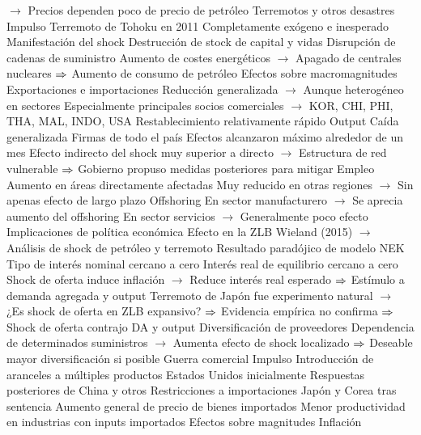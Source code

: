 \documentclass{nuevotema}
\begin{document}
\begin{esquemal}
				\4[] $\to$ Precios dependen poco de precio de petróleo
		\2 Terremotos y otros desastres
			\3 Impulso
				\4 Terremoto de Tohoku en 2011
				\4 Completamente exógeno e inesperado
			\3 Manifestación del shock
				\4 Destrucción de stock de capital y vidas
				\4 Disrupción de cadenas de suministro
				\4 Aumento de costes energéticos
				\4[] $\to$ Apagado de centrales nucleares
				\4[] $\Rightarrow$ Aumento de consumo de petróleo
			\3 Efectos sobre macromagnitudes
				\4 Exportaciones e importaciones
				\4[] Reducción generalizada
				\4[] $\to$ Aunque heterogéneo en sectores
				\4[] Especialmente principales socios comerciales
				\4[] $\to$ KOR, CHI, PHI, THA, MAL, INDO, USA
				\4[] Restablecimiento relativamente rápido
				\4 Output
				\4[] Caída generalizada
				\4[] Firmas de todo el país
				\4[] Efectos alcanzaron máximo alrededor de un mes
				\4[] Efecto indirecto del shock muy superior a directo
				\4[] $\to$ Estructura de red vulnerable
				\4[] $\Rightarrow$ Gobierno propuso medidas posteriores para mitigar
				\4 Empleo
				\4[] Aumento en áreas directamente afectadas
				\4[] Muy reducido en otras regiones
				\4[] $\to$ Sin apenas efecto de largo plazo
				\4 Offshoring
				\4[] En sector manufacturero
				\4[] $\to$ Se aprecia aumento del offshoring
				\4[] En sector servicios
				\4[] $\to$ Generalmente poco efecto
			\3 Implicaciones de política económica
				\4 Efecto en la ZLB
				\4[] Wieland (2015)
				\4[] $\to$ Análisis de shock de petróleo y terremoto
				\4[] Resultado paradójico de modelo NEK
				\4[] Tipo de interés nominal cercano a cero
				\4[] Interés real de equilibrio cercano a cero
				\4[] Shock de oferta induce inflación
				\4[] $\to$ Reduce interés real esperado
				\4[] $\Rightarrow$ Estímulo a demanda agregada y output
				\4[] Terremoto de Japón fue experimento natural
				\4[] $\to$ ¿Es shock de oferta en ZLB expansivo?
				\4[] $\Rightarrow$ Evidencia empírica no confirma
				\4[] $\Rightarrow$ Shock de oferta contrajo DA y output
				\4 Diversificación de proveedores
				\4[] Dependencia de determinados suministros
				\4[] $\to$ Aumenta efecto de shock localizado
				\4[] $\Rightarrow$ Deseable mayor diversificación si posible
		\2 Guerra comercial
			\3 Impulso
				\4 Introducción de aranceles a múltiples productos
				\4[] Estados Unidos inicialmente
				\4[] Respuestas posteriores de China y otros
				\4 Restricciones a importaciones
				\4[] Japón y Corea tras sentencia
				\4 Aumento general de precio de bienes importados
				\4[] Menor productividad en industrias con inputs importados
			\3 Efectos sobre magnitudes
				\4 Inflación

\end{esquemal}
\end{document}
